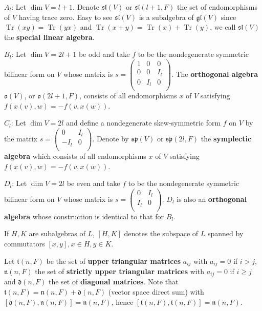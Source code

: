 \begin{example}
    $A_l$: Let $\operatorname{dim} V=l+1$. Denote $\mathfrak{sl}(V)$ or $\mathfrak{sl}(l+1,F)$ the set of endomorphisms of $V$ having trace zero. Easy to see $\mathfrak{sl}(V)$ is a subalgebra of $\mathfrak{gl}(V)$ since $\operatorname{Tr}(xy)=\operatorname{Tr}(yx)$ and $\operatorname{Tr}(x+y)=\operatorname{Tr}(x)+\operatorname{Tr}(y)$, we call $\mathfrak{sl}(V)$ the \textbf{special linear algebra}.

    $B_l$: Let $\operatorname{dim} V= 2l+1$ be odd and take $f$ to be the nondegenerate symmetric bilinear form on $V$ whose matrix is $s=\begin{pmatrix}
        1 & 0 & 0 \\
        0 & 0 & I_l \\
        0 & I_l & 0 \\
    \end{pmatrix}$. The \textbf{orthogonal algebra} $\mathfrak{o}(V)$, or $\mathfrak{o}(2l+1,F)$, consists of all endomorphisms $x$ of $V$ satisfying $f(x(v),w)=-f(v,x(w))$.

    $C_l$: Let $\operatorname{dim} V=2l$ and define a nondegenerate skew-symmetric form $f$ on $V$ by the matrix $s=\begin{pmatrix}
        0 & I_l \\
        -I_l & 0 \\
    \end{pmatrix}$. Denote by $\mathfrak{sp}(V)$ or $\mathfrak{sp}(2l,F)$ the \textbf{symplectic algebra} which consists of all endomorphisms $x$ of $V$ satisfying $f(x(v),w)=-f(v,x(w))$.

    $D_l$: Let $\operatorname{dim} V=2l$ be even and take $f$ to be the nondegenerate symmetric bilinear form on $V$ whose matrix is $s=\begin{pmatrix}
        0 & I_l \\
        I_l & 0 \\
    \end{pmatrix}$. $D_l$ is also an \textbf{orthogonal algebra} whose construction is identical to that for $B_l$.
\end{example}

\begin{definition}
    If $H,K$ are subalgebras of $L$, $[H,K]$ denotes the subspace of $L$ spanned by commutators $[x,y], x \in H,y \in K$. 
\end{definition}

\begin{example}
    Let $\mathfrak{t}(n,F)$ be the set of \textbf{upper triangular matrices} $a_{ij}$ with $a_{ij}=0$ if $i>j$, $\mathfrak{n}(n,F)$ the set of \textbf{strictly upper triangular matrices} with $a_{ij}=0$ if $i\geqslant j$ and $\mathfrak{d}(n,F)$ the set of \textbf{diagonal matrices}. Note that $\mathfrak{t}(n,F)=\mathfrak{n}(n,F)+\mathfrak{d}(n,F)$ (vector space direct sum) with $[\mathfrak{d}(n,F),\mathfrak{n}(n,F)]=\mathfrak{n}(n,F)$, hence $[\mathfrak{t}(n,F),\mathfrak{t}(n,F)]=\mathfrak{n}(n,F)$.
\end{example}

